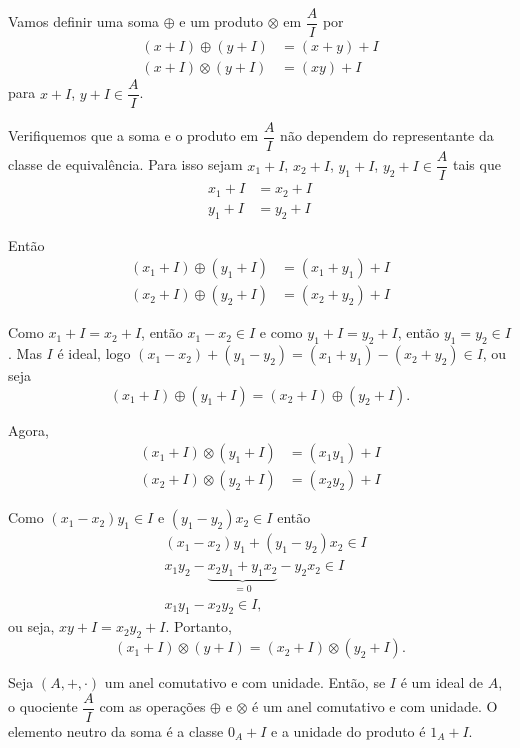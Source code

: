 Vamos definir uma soma $\oplus$ e um produto $\otimes$ em $\dfrac{A}{I}$ por
\begin{align*}
	(x + I)\oplus(y + I) &= (x + y) + I\\
	(x + I)\otimes(y + I) &= (xy) + I
\end{align*}
para $x + I$, $y + I \in \dfrac{A}{I}$.

Verifiquemos que a soma e o produto em $\dfrac{A}{I}$ n{\~a}o dependem do representante da classe de equival{\^e}ncia.
Para isso sejam $x_1 + I$, $x_2 + I$, $y_1 + I$, $y_2 + I \in \dfrac{A}{I}$ tais que
\begin{align*}
	x_1 + I &= x_2 + I\\
	y_1 + I &= y_2 + I
\end{align*}

Ent{\~a}o
\begin{align*}
	(x_1 + I) \oplus (y_1 + I) &= (x_1 + y_1) + I\\
	(x_2 + I) \oplus (y_2 + I) &= (x_2 + y_2) + I
\end{align*}

Como $x_1 + I = x_2 + I$, ent{\~a}o $x_1 - x_2 \in I$ e como $y_1 + I = y_2 + I$, ent{\~a}o $y_1 = y_2 \in I$. Mas $I$ {\'e} ideal, logo $(x_1 - x_2) + (y_1 - y_2) = (x_1 + y_1) - (x_2 + y_2) \in I$, ou seja
\[
	(x_1 + I) \oplus (y_1 + I) = (x_2 + I) \oplus (y_2 + I).
\]

Agora,
\begin{align*}
	(x_1 + I) \otimes (y_1 + I) &= (x_1y_1) + I\\
	(x_2 + I) \otimes (y_2 + I) &= (x_2y_2) + I
\end{align*}

Como $(x_1 - x_2)y_1 \in I$ e $(y_1 - y_2)x_2 \in I$ ent\~ao
\begin{align*}
	&(x_1 - x_2)y_1 + (y_1 - y_2)x_2 \in I\\
	&x_1y_2-\underbrace{x_2y_1 + y_1x_2}_{= 0} - y_2x_2 \in I\\
	&x_1y_1 - x_2y_2\in I,
\end{align*}
ou seja, $xy + I = x_2y_2 + I$. Portanto,
\[
	(x_1 + I) \otimes (y + I) = (x_2 + I) \otimes (y_2 + I).
\]

\begin{teorema}
	Seja $(A, +, \cdot)$ um anel comutativo e com unidade. Ent{\~a}o, se $I$ {\'e} um ideal de $A$,
	o quociente $\dfrac{A}{I}$ com as opera{\c c}{\~o}es $\oplus$ e $\otimes$ {\'e} um anel comutativo e com unidade. O elemento neutro da soma {\'e} a classe $0_{A} + I$ e a unidade do produto {\'e} $1_{A} + I$.
\end{teorema}
